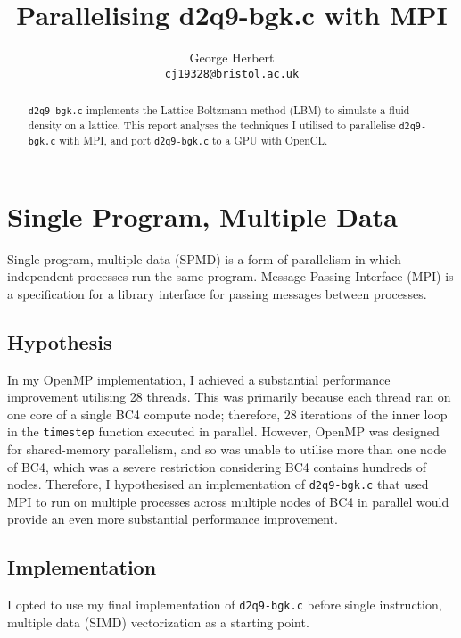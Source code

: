 \documentclass[twocolumn, a4paper]{article}
\author{
  George Herbert\\
  \texttt{cj19328@bristol.ac.uk}
}
\title{\vspace{-2em}Parallelising d2q9-bgk.c with MPI}
\begin{document}
\maketitle

\begin{abstract}
  \texttt{d2q9-bgk.c} implements the Lattice Boltzmann method (LBM) to simulate a fluid density on a lattice.
  This report analyses the techniques I utilised to parallelise \texttt{d2q9-bgk.c} with MPI, and port \texttt{d2q9-bgk.c} to a GPU with OpenCL.
\end{abstract}

\section{Single Program, Multiple Data}

Single program, multiple data (SPMD) is a form of parallelism in which independent processes run the same program.
Message Passing Interface (MPI) is a specification for a library interface for passing messages between processes.

\subsection{Hypothesis}

In my OpenMP implementation, I achieved a substantial performance improvement utilising 28 threads.
This was primarily because each thread ran on one core of a single BC4 compute node; therefore, 28 iterations of the inner loop in the \texttt{timestep} function executed in parallel.
However, OpenMP was designed for shared-memory parallelism, and so was unable to utilise more than one node of BC4, which was a severe restriction considering BC4 contains hundreds of nodes.
Therefore, I hypothesised an implementation of \texttt{d2q9-bgk.c} that used MPI to run on multiple processes across multiple nodes of BC4 in parallel would provide an even more substantial performance improvement.

\subsection{Implementation}

I opted to use my final implementation of \texttt{d2q9-bgk.c} before single instruction, multiple data (SIMD) vectorization as a starting point.
\end{document}

